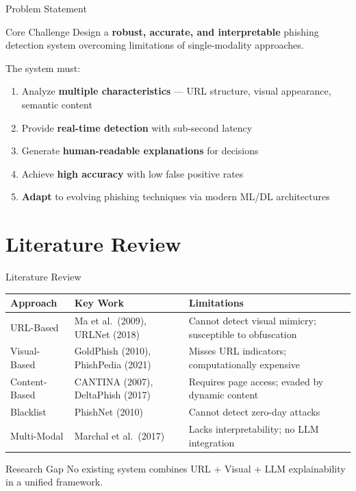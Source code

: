 \documentclass[aspectratio=169,12pt]{beamer}
\begin{document}
\begin{frame}{Problem Statement}
    \begin{block}{Core Challenge}
        Design a \textbf{robust, accurate, and interpretable} phishing detection system overcoming limitations of single-modality approaches.
    \end{block}
    \vspace{0.4cm}
    The system must:
    \begin{enumerate}
        \item Analyze \textbf{multiple characteristics} --- URL structure, visual appearance, semantic content
        \item Provide \textbf{real-time detection} with sub-second latency
        \item Generate \textbf{human-readable explanations} for decisions
        \item Achieve \textbf{high accuracy} with low false positive rates
        \item \textbf{Adapt} to evolving phishing techniques via modern ML/DL architectures
    \end{enumerate}
\end{frame}

\section{Literature Review}

\begin{frame}{Literature Review}
    \footnotesize
    \begin{table}
        \centering
        \begin{tabular}{p{2cm}p{4.2cm}p{4.2cm}}
            \toprule
            \textbf{Approach} & \textbf{Key Work} & \textbf{Limitations} \\
            \midrule
            URL-Based & Ma et al.\ (2009), URLNet (2018) & Cannot detect visual mimicry; susceptible to obfuscation \\
            Visual-Based & GoldPhish (2010), PhishPedia (2021) & Misses URL indicators; computationally expensive \\
            Content-Based & CANTINA (2007), DeltaPhish (2017) & Requires page access; evaded by dynamic content \\
            Blacklist & PhishNet (2010) & Cannot detect zero-day attacks \\
            Multi-Modal & Marchal et al.\ (2017) & Lacks interpretability; no LLM integration \\
            \bottomrule
        \end{tabular}
    \end{table}
    \vspace{0.2cm}
    \begin{alertblock}{Research Gap}
        No existing system combines URL + Visual + LLM explainability in a unified framework.
    \end{alertblock}
\end{frame}
\end{document}
